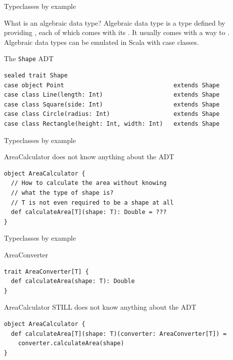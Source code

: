 \begin{frame}[fragile]{Typeclasses by example}
\begin{block}{What is an algebraic data type?}
Algebraic data type is a type defined by providing , each of which comes with its . It
usually comes with a way to . Algebraic data types can be emulated in Scala with case classes.
\end{block}
\pause
\begin{exampleblock}{The \lstinline!Shape! ADT}
\begin{lstlisting}
sealed trait Shape
case object Point								extends Shape
case class Line(length: Int)					extends Shape
case class Square(side: Int)					extends Shape
case class Circle(radius: Int)					extends Shape
case class Rectangle(height: Int, width: Int)	extends Shape
\end{lstlisting}
\end{exampleblock}
\end{frame}

\begin{frame}[fragile]{Typeclasses by example}
\begin{alertblock}{AreaCalculator does not know anything about the ADT}
\begin{lstlisting}
object AreaCalculator {
  // How to calculate the area without knowing
  // what the type of shape is?
  // T is not even required to be a shape at all
  def calculateArea[T](shape: T): Double = ???
}
\end{lstlisting}
\end{alertblock}
\end{frame}

\begin{frame}[fragile]{Typeclasses by example}
\begin{block}{AreaConverter}
\begin{lstlisting}
trait AreaConverter[T] {
  def calculateArea(shape: T): Double
}
\end{lstlisting}
\end{block}
\begin{block}{AreaCalculator STILL does not know anything about the ADT}
\begin{lstlisting}
object AreaCalculator {
  def calculateArea[T](shape: T)(converter: AreaConverter[T]) =
    converter.calculateArea(shape)
}
\end{lstlisting}
\end{block}
\end{frame}

